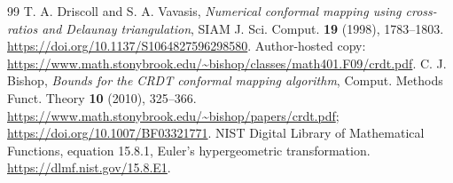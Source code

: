 \documentclass[11pt,a4paper]{article}
\theoremstyle{definition}
\theoremstyle{remark}
\numberwithin{equation}{section}
\begin{document}
\begin{thebibliography}{99}
T. A. Driscoll and S. A. Vavasis, \emph{Numerical conformal mapping using cross-ratios and Delaunay triangulation}, SIAM J. Sci. Comput. \textbf{19} (1998), 1783--1803. \url{https://doi.org/10.1137/S1064827596298580}.
 Author-hosted copy: \url{https://www.math.stonybrook.edu/~bishop/classes/math401.F09/crdt.pdf}.
C. J. Bishop, \emph{Bounds for the CRDT conformal mapping algorithm}, Comput. Methods Funct. Theory \textbf{10} (2010), 325--366. \url{https://www.math.stonybrook.edu/~bishop/papers/crdt.pdf}; \url{https://doi.org/10.1007/BF03321771}.
NIST Digital Library of Mathematical Functions, equation 15.8.1, Euler's hypergeometric transformation. \url{https://dlmf.nist.gov/15.8.E1}.
\end{thebibliography}
\end{document}
